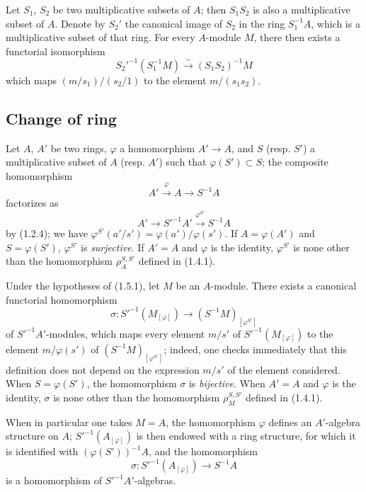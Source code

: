 \begin{env}[1.4.6]
\label{0.1.4.6}
Let $S_1$, $S_2$ be two multiplicative subsets of $A$; then $S_1S_2$ is also a multiplicative subset of $A$.
Denote by $S_2'$ the canonical image of $S_2$ in the ring $S_1^{-1}A$, which is a multiplicative subset of that ring.
For every $A$-module $M$, there then exists a functorial isomorphism
\[
  S_2'^{-1}(S_1^{-1}M)\xrightarrow{\sim}(S_1S_2)^{-1}M
\]
which maps $(m/s_1)/(s_2/1)$ to the element $m/(s_1s_2)$.
\end{env}

\subsection{Change of ring}
\label{subsection:0.1.5}

\begin{env}[1.5.1]
\label{0.1.5.1}
Let $A$, $A'$ be two rings, $\varphi$ a homomorphism $A'\to A$, and $S$ (resp. $S'$) a multiplicative subset of $A$ (resp. $A'$) such that $\varphi(S')\subset S$; the composite homomorphism
\[
  A'\xrightarrow{\varphi}A\longrightarrow S^{-1}A
\]
factorizes as
\[
  A'\longrightarrow S'^{-1}A'\xrightarrow{\varphi^{S'}}S^{-1}A
\]
by (1.2.4); we have $\varphi^{S'}(a'/s')=\varphi(a')/\varphi(s')$.
If $A=\varphi(A')$ and $S=\varphi(S')$, $\varphi^{S'}$ is \emph{surjective}.
If $A'=A$ and $\varphi$ is the identity, $\varphi^{S'}$ is none other than the homomorphism $\rho_A^{S,S'}$ defined in (1.4.1).
\end{env}

\begin{env}[1.5.2]
\label{0.1.5.2}
Under the hypotheses of (1.5.1), let $M$ be an $A$-module.
There exists a canonical functorial homomorphism
\[
  \sigma:S'^{-1}(M_{[\varphi]})\longrightarrow
  (S^{-1}M)_{[\varphi^{S'}]}
\]
of $S'^{-1}A'$-modules, which maps every element $m/s'$ of $S'^{-1}(M_{[\varphi]})$ to the element $m/\varphi(s')$ of $(S^{-1}M)_{[\varphi^{S'}]}$; indeed, one checks immediately that this definition does not depend on the expression $m/s'$ of the element considered.
When $S=\varphi(S')$, the homomorphism $\sigma$ is \emph{bijective}.
When $A'=A$ and $\varphi$ is the identity, $\sigma$ is none other than the homomorphism $\rho_M^{S,S'}$ defined in (1.4.1).

When in particular one takes $M=A$, the homomorphism $\varphi$ defines an $A'$-algebra structure on $A$; $S'^{-1}(A_{[\varphi]})$ is then endowed with a ring structure, for which it is identified with $(\varphi(S'))^{-1}A$, and the homomorphism
\[
  \sigma:S'^{-1}(A_{[\varphi]})\longrightarrow S^{-1}A
\]
is a homomorphism of $S'^{-1}A'$-algebras.
\end{env}

